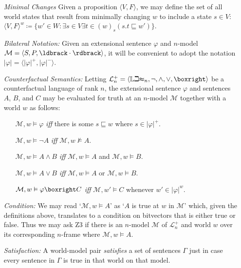\documentclass[a4paper, 11pt]{article} %
\newcommand{\tuple}[1]{\langle#1\rangle} %
\newcommand{\set}[1]{\lbrace#1\rbrace} %
\newcommand{\Lit}[0]{\mathbb{Lit}}
\newcommand{\M}[0]{\mathcal{M}}
\renewcommand{\L}[0]{\mathcal{L}}
\renewcommand{\Vert}[1]{\ldbrack#1\rdbrack}
\renewcommand{\vert}[1]{\lvert#1\rvert}
\begin{document}
\begin{enumerate}
  \item[\it Minimal Changes] Given a proposition $\tuple{V,F}$, we may define the set of all world states that result from minimally changing $w$ to include a state $s\in V$:\\ 
      $\tuple{V,F}^w\coloneq \set{w'\in W:\exists s\in V\exists t\in(w)_s(s.t\sqsubseteq w')}$.
  \item[\it Bilateral Notation:] Given an extensional sentence $\varphi$ and $n$-model $\M=\tuple{S,P,\Vert{\cdot}}$, it will be convenient to adopt the notation $\vert{\varphi}=\tuple{\vert{\varphi}^+,\vert{\varphi}^-}$.
  \item[\it Counterfactual Semantics:] Letting $\L_n^+=\tuple{\Lit_n,\neg,\wedge,\vee,\boxright}$ be a counterfactual language of rank $n$, the extensional sentence $\varphi$ and sentences $A$, $B$, and $C$ may be evaluated for truth at an $n$-model $\M$ together with a world $w$ as follows:
    \begin{itemize}
      \item[] $\M, w \vDash \varphi$ \textit{iff} there is some $s \sqsubseteq w$ where $s \in \vert{\varphi}^+$.
      \item[] $\M, w \vDash \neg A$ \textit{iff} $\M, w \nvDash A$.
      \item[] $\M, w \vDash A \wedge B$ \textit{iff} $\M, w \vDash A$ and $\M, w \vDash B$.
      \item[] $\M, w \vDash A \vee B$ \textit{iff} $\M, w \vDash A$ or $\M, w \vDash B$.
      \item[] $\M, w \vDash \varphi\boxright C$ \textit{iff} $\M, w' \vDash C$ whenever $w'\in\vert{\varphi}^w$.
    \end{itemize}
  \item[\it Condition:] We may read `$\M, w \vDash A$' as `$A$ is true at $w$ in $\M$' which, given the definitions above, translates to a condition on bitvectors that is either true or false. Thus we may ask Z3 if there is an $n$-model $\M$ of $\L_n^+$ and world $w$ over its corresponding $n$-frame where $\M, w \vDash A$.
  \item[\it Satisfaction:] A world-model pair \textit{satisfies} a set of sentences $\Gamma$ just in case every sentence in $\Gamma$ is true in that world on that model.

\end{enumerate}
\end{document}
